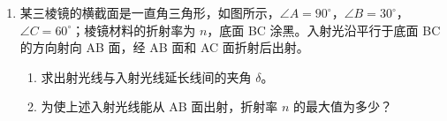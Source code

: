 \documentclass[\gkver]{gaokaozhenti}
\begin{document}
\begin{enumerate}
（a）将设计的电路图画在下方虚线框内。

（b）灯两端电压可调节的范围为 。

（c）按设计的电路图，将如图所示仪器用线（表示导线）连接起来。
\onepicture[align=right, w=7.00cm]{}

\item
某三棱镜的横截面是一直角三角形，如图所示，$\angle A = 90^{\circ}$，$\angle B = 30^{\circ}$，$\angle C = 60^{\circ}$；棱镜材料的折射率为 $n$，底面 BC 涂黑。入射光沿平行于底面 BC 的方向射向 AB 面，经 AB 面和 AC 面折射后出射。
\begin{enumerate}
	\item
	求出射光线与入射光线延长线间的夹角 $\delta$。
	\item
	为使上述入射光线能从 AB 面出射，折射率 $n$ 的最大值为多少？
\end{enumerate}
\onepicture[align=right, w=6.26cm]{}
\end{enumerate}
\end{document}
